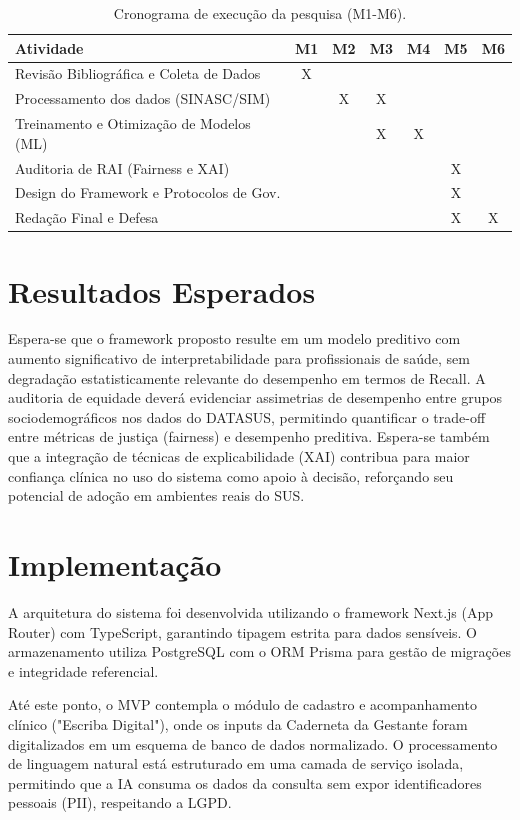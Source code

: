 \documentclass[12pt]{article}
\begin{document}
\begin{table}[ht]
\centering
\caption{Cronograma de execução da pesquisa (M1-M6).}
\label{tab:cronograma}
\begin{tabular}{|l|c|c|c|c|c|c|}
\hline
\textbf{Atividade} & \textbf{M1} & \textbf{M2} & \textbf{M3} & \textbf{M4} & \textbf{M5} & \textbf{M6} \\ \hline
Revisão Bibliográfica e Coleta de Dados & X &  &  &  &  &  \\ \hline
Processamento dos dados (SINASC/SIM) &  & X & X &  &  &  \\ \hline
Treinamento e Otimização de Modelos (ML) &  &  & X & X &  &  \\ \hline
Auditoria de RAI (Fairness e XAI) &  &  &  &  & X &  \\ \hline
Design do Framework e Protocolos de Gov. &  &  &  &  & X &  \\ \hline
Redação Final e Defesa &  &  &  &  & X & X \\ \hline
\end{tabular}
\end{table}

\section{Resultados Esperados}
Espera-se que o framework proposto resulte em um modelo preditivo com aumento significativo de interpretabilidade para profissionais de saúde, sem degradação estatisticamente relevante do desempenho em termos de Recall. A auditoria de equidade deverá evidenciar assimetrias de desempenho entre grupos sociodemográficos nos dados do DATASUS, permitindo quantificar o trade-off entre métricas de justiça (fairness) e desempenho preditiva. Espera-se também que a integração de técnicas de explicabilidade (XAI) contribua para maior confiança clínica no uso do sistema como apoio à decisão, reforçando seu potencial de adoção em ambientes reais do SUS.

\section{Implementação}
A arquitetura do sistema foi desenvolvida utilizando o framework Next.js (App Router) com TypeScript, garantindo tipagem estrita para dados sensíveis. O armazenamento utiliza PostgreSQL com o ORM Prisma para gestão de migrações e integridade referencial. 

Até este ponto, o MVP contempla o módulo de cadastro e acompanhamento clínico ("Escriba Digital"), onde os inputs da Caderneta da Gestante foram digitalizados em um esquema de banco de dados normalizado. O processamento de linguagem natural está estruturado em uma camada de serviço isolada, permitindo que a IA consuma os dados da consulta sem expor identificadores pessoais (PII), respeitando a LGPD.
\end{document}
